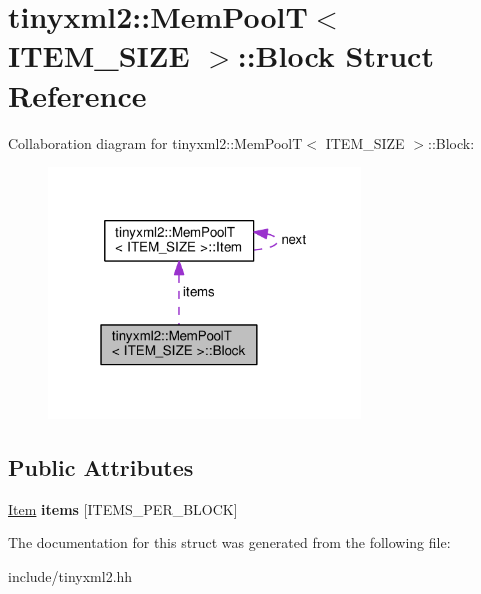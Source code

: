 \hypertarget{structtinyxml2_1_1MemPoolT_1_1Block}{}\section{tinyxml2\+:\+:Mem\+PoolT$<$ I\+T\+E\+M\+\_\+\+S\+I\+ZE $>$\+:\+:Block Struct Reference}
\label{structtinyxml2_1_1MemPoolT_1_1Block}


Collaboration diagram for tinyxml2\+:\+:Mem\+PoolT$<$ I\+T\+E\+M\+\_\+\+S\+I\+ZE $>$\+:\+:Block\+:
\nopagebreak
\begin{figure}[H]
\begin{center}
\leavevmode
\includegraphics[width=235pt]{structtinyxml2_1_1MemPoolT_1_1Block__coll__graph}
\end{center}
\end{figure}
\subsection*{Public Attributes}
\begin{DoxyCompactItemize}
\item 
\hyperlink{uniontinyxml2_1_1MemPoolT_1_1Item}{Item} {\bfseries items} \mbox{[}I\+T\+E\+M\+S\+\_\+\+P\+E\+R\+\_\+\+B\+L\+O\+CK\mbox{]}\hypertarget{structtinyxml2_1_1MemPoolT_1_1Block_a4f2589e877b60f26313e107433e550f7}{}\label{structtinyxml2_1_1MemPoolT_1_1Block_a4f2589e877b60f26313e107433e550f7}

\end{DoxyCompactItemize}


The documentation for this struct was generated from the following file\+:\begin{DoxyCompactItemize}
\item 
include/tinyxml2.\+hh\end{DoxyCompactItemize}
